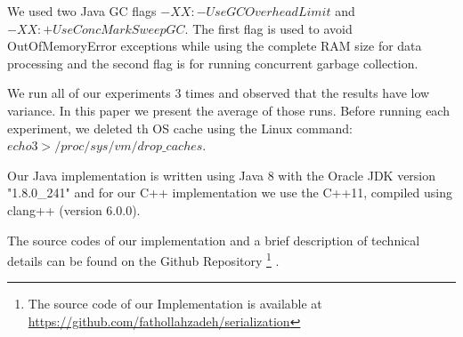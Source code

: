 We used two Java GC flags $-XX:-UseGCOverheadLimit$ and $-XX:+UseConcMarkSweepGC$. The first flag is used to avoid OutOfMemoryError exceptions while using the complete RAM size for data processing and the second flag is for running concurrent garbage collection.

We run all of our experiments 3 times and observed that the results have low variance. In this paper we present the average of those runs. Before running each experiment, we deleted th OS cache using the Linux command: $echo 3 > /proc/sys/vm/drop\_caches$.

Our Java implementation is written using Java 8 with the Oracle JDK version "1.8.0\_241" and for our C++ implementation we use the C++11, compiled using clang++ (version 6.0.0).

The source codes of our implementation and a brief description of technical details can be found on the Github Repository \footnote{The source code of our Implementation is available at \url{https://github.com/fathollahzadeh/serialization}} .
